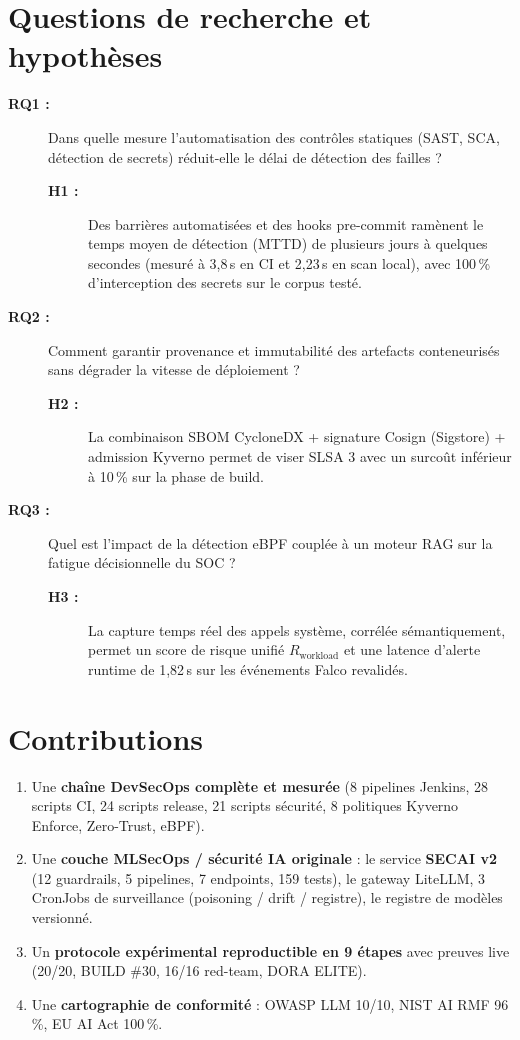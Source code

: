 \documentclass[12pt,a4paper,openany]{report}
\begin{document}
\section{Questions de recherche et hypothèses}

\begin{description}
  \item[\textbf{RQ1 :}] Dans quelle mesure l'automatisation des contrôles statiques
  (SAST, SCA, détection de secrets) réduit-elle le délai de détection des failles ?
  \begin{description}
    \item[\textbf{H1 :}] Des barrières automatisées et des hooks pre-commit ramènent le temps
    moyen de détection (MTTD) de plusieurs jours à quelques secondes (mesuré à 3,8\,s en CI
    et 2,23\,s en scan local), avec 100\,\% d'interception des secrets sur le corpus testé.
  \end{description}
  \item[\textbf{RQ2 :}] Comment garantir provenance et immutabilité des artefacts conteneurisés
  sans dégrader la vitesse de déploiement ?
  \begin{description}
    \item[\textbf{H2 :}] La combinaison SBOM CycloneDX + signature Cosign (Sigstore) + admission
    Kyverno permet de viser SLSA 3 avec un surcoût inférieur à 10\,\% sur la phase de build.
  \end{description}
  \item[\textbf{RQ3 :}] Quel est l'impact de la détection eBPF couplée à un moteur RAG
  sur la fatigue décisionnelle du SOC ?
  \begin{description}
    \item[\textbf{H3 :}] La capture temps réel des appels système, corrélée sémantiquement,
    permet un score de risque unifié $R_{\text{workload}}$ et une latence d'alerte runtime
    de 1,82\,s sur les événements Falco revalidés.
  \end{description}
\end{description}

\section{Contributions}

\begin{enumerate}
  \item Une \textbf{chaîne DevSecOps complète et mesurée} (8 pipelines Jenkins, 28 scripts CI,
  24 scripts release, 21 scripts sécurité, 8 politiques Kyverno Enforce, Zero-Trust, eBPF).
  \item Une \textbf{couche MLSecOps / sécurité IA originale} : le service \textbf{SECAI v2}
  (12 guardrails, 5 pipelines, 7 endpoints, 159 tests), le gateway LiteLLM, 3 CronJobs de
  surveillance (poisoning / drift / registre), le registre de modèles versionné.
  \item Un \textbf{protocole expérimental reproductible en 9 étapes} avec preuves live
  (20/20, BUILD \#30, 16/16 red-team, DORA ELITE).
  \item Une \textbf{cartographie de conformité} : OWASP LLM 10/10, NIST AI RMF 96\,\%,
  EU AI Act 100\,\%.
\end{enumerate}
\end{document}
